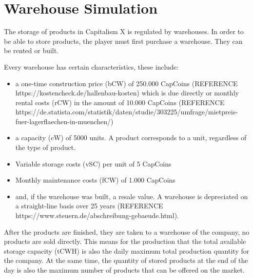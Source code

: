 \section{Warehouse Simulation} \label{warehouse_simulation}


The storage of products in Capitalism X is regulated by warehouses. In order to be able to store products, the player must first purchase a warehouse. They can be rented or built.

Every warehouse has certain characteristics, these include:
\begin{itemize}
    \item a one-time construction price (\gls{bCW}) of 250.000 CapCoins (REFERENCE https://kostencheck.de/hallenbau-kosten) which is due directly or monthly rental costs (\gls{rCW}) in the amount of 10.000 CapCoins (REFERENCE https://de.statista.com/statistik/daten/studie/303225/umfrage/mietpreis-fuer-lagerflaechen-in-muenchen/)
    \item a capacity (\gls{cW}) of 5000 units. A product corresponds to a unit, regardless of the type of product.
    \item Variable storage costs (\gls{vSC}) per unit of 5 CapCoins
    \item Monthly maintenance costs (\gls{fCW}) of 1.000 CapCoins
    \item and, if the warehouse was built, a resale value. A warehouse is depreciated on a straight-line basis over 25 years 
    (REFERENCE https://www.steuern.de/abschreibung-gebaeude.html).
\end{itemize}

After the products are finished, they are taken to a warehouse of the company, no products are sold directly. This means for the production that the total available storage capacity (\gls{tCWH}) is also the daily maximum total production quantity for the company. At the same time, the quantity of stored products at the end of the day is also the maximum number of products that can be offered on the market. 

